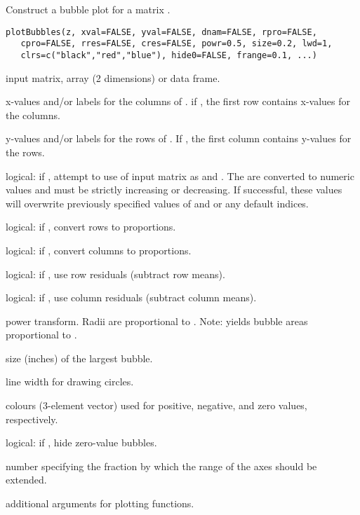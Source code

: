 \documentclass[letterpaper]{book}
\begin{document}
\begin{Description}\relax
Construct a bubble plot for a matrix .
\end{Description}
\begin{Usage}
\begin{verbatim}
plotBubbles(z, xval=FALSE, yval=FALSE, dnam=FALSE, rpro=FALSE, 
   cpro=FALSE, rres=FALSE, cres=FALSE, powr=0.5, size=0.2, lwd=1,
   clrs=c("black","red","blue"), hide0=FALSE, frange=0.1, ...) 
\end{verbatim}
\end{Usage}
\begin{Arguments}
\begin{ldescription}
\item[\code{z}] input matrix, array (2 dimensions) or data frame.
\item[\code{xval}] x-values and/or labels for the columns of . 
if , the first row contains x-values for the columns.
\item[\code{yval}] y-values and/or labels for the rows of . 
If , the first column contains y-values for the rows.
\item[\code{dnam}] logical: if , attempt to use  of input
matrix  as  and . The  are 
converted to numeric values and must be strictly increasing or decreasing. 
If successful, these values will overwrite previously specified values
of  and  or any default indices.
\item[\code{rpro}] logical: if , convert rows to proportions.
\item[\code{cpro}] logical: if , convert columns to proportions.
\item[\code{rres}] logical: if , use row residuals (subtract row means).
\item[\code{cres}] logical: if , use column residuals (subtract column means).
\item[\code{powr}] power transform. Radii are proportional to . 
Note:  yields bubble areas proportional to .
\item[\code{size}] size (inches) of the largest bubble.
\item[\code{lwd}] line width for drawing circles.
\item[\code{clrs}] colours (3-element vector) used for positive, negative, 
and zero values, respectively.
\item[\code{hide0}] logical: if , hide zero-value bubbles.
\item[\code{frange}] number specifying the fraction by which the range of the axes should be extended.
\item[\code{...}] additional arguments for plotting functions.
\end{ldescription}
\end{Arguments}
\end{document}
